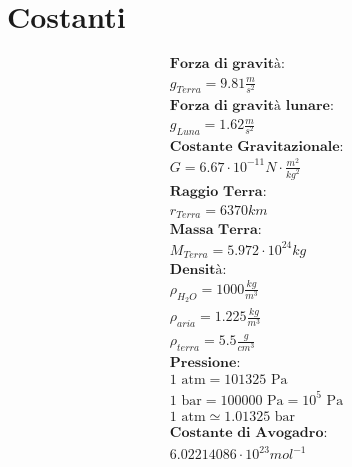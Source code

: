 \section{Costanti}

\begin{gather*}
    \textbf{Forza di gravità: } \\ g_{Terra} = 9.81 \frac{m}{s^2} \\
    \textbf{Forza di gravità lunare: } \\ g_{Luna} = 1.62 \frac{m}{s^2} \\
    \textbf{Costante Gravitazionale: } \\
    G = 6.67 \cdot 10^{-11} N \cdot \frac{m^2}{kg^2} \\
    \textbf{Raggio Terra: } \\ r_{Terra} = 6370 km \\
    \textbf{Massa Terra: } \\ M_{Terra} = 5.972 \cdot 10^{24} kg \\
    \textbf{Densità: } \\
    \rho_{H_2O} = 1000 \frac{kg}{m^3} \\
    \rho_{aria} = 1.225 \frac{kg}{m^3} \\
    \rho_{terra} = 5.5 \frac{g}{cm^3} \\
    \textbf{Pressione: } \\
    1 \text{ atm} = 101 325 \text{ Pa} \\
    1 \text{ bar} = 100 000 \text{ Pa} = 10^5 \text{ Pa} \\
    1 \text{ atm} \simeq 1.01325 \text{ bar} \\
    \textbf{Costante di Avogadro: } \\
    6.02214086 \cdot 10^{23} mol^{-1}
\end{gather*}